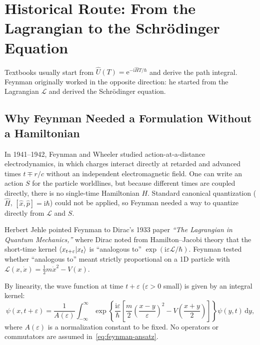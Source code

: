 \documentclass[11pt,a4paper]{article}
\newcommand{\ii}{\mathrm{i}}
\newcommand{\dd}{\mathrm{d}}
\newcommand{\ee}{\mathrm{e}}
\newcommand{\Lag}{\mathcal{L}}
\begin{document}
\section[Historical Route: From Lagrangian to Schr\"odinger]{Historical Route: From the Lagrangian to the Schr\"odinger Equation}
\label{sec:historical}

Textbooks usually start from $\hat U(T) = \ee^{-\ii\hat H T/\hbar}$ and derive the path integral. Feynman originally worked in the opposite direction: he started from the Lagrangian $\Lag$ and derived the Schr\"odinger equation.

\subsection{Why Feynman Needed a Formulation Without a Hamiltonian}

In 1941--1942, Feynman and Wheeler studied action-at-a-distance electrodynamics, in which charges interact directly at retarded and advanced times $t \mp r/c$ without an independent electromagnetic field. One can write an action $S$ for the particle worldlines, but because different times are coupled directly, there is no single-time Hamiltonian $H$. Standard canonical quantization ($\hat H$, $[\hat x,\hat p]=\ii\hbar$) could not be applied, so Feynman needed a way to quantize directly from $\Lag$ and $S$.

Herbert Jehle pointed Feynman to Dirac's 1933 paper \emph{``The Lagrangian in Quantum Mechanics,''} where Dirac noted from Hamilton--Jacobi theory that the short-time kernel $\braket{x_{t+\varepsilon}|x_t}$ is ``analogous to'' $\exp(\ii\varepsilon\Lag/\hbar)$. Feynman tested whether ``analogous to'' meant strictly proportional on a 1D particle with $\Lag(x,\dot x) = \frac{1}{2}m\dot x^2 - V(x)$.

By linearity, the wave function at time $t+\varepsilon$ ($\varepsilon > 0$ small) is given by an integral kernel:
\begin{equation}
    \psi(x,t+\varepsilon) = \frac{1}{A(\varepsilon)}\int_{-\infty}^{\infty}
    \exp\!\left\{\frac{\ii\varepsilon}{\hbar}\left[
        \frac{m}{2}\!\left(\frac{x-y}{\varepsilon}\right)^2
        - V\!\left(\frac{x+y}{2}\right)
    \right]\right\}\psi(y,t)\,\dd y,
    \label{eq:feynman-ansatz}
\end{equation}
where $A(\varepsilon)$ is a normalization constant to be fixed. No operators or commutators are assumed in~\eqref{eq:feynman-ansatz}.
\end{document}
